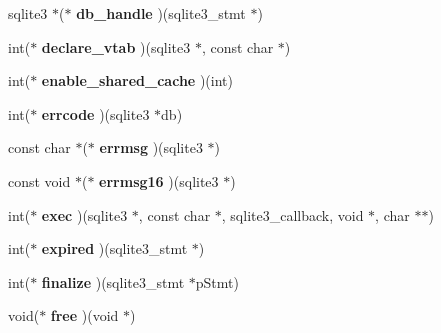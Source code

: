 \begin{DoxyCompactItemize}
sqlite3 $\ast$($\ast$ {\bfseries db\+\_\+handle} )(sqlite3\+\_\+stmt $\ast$)
\item 
\mbox{\label{structsqlite3__api__routines_abe47369f89df1193ca28751e8d024818}} 
int($\ast$ {\bfseries declare\+\_\+vtab} )(sqlite3 $\ast$, const char $\ast$)
\item 
\mbox{\label{structsqlite3__api__routines_ae67da9e0a3629fd1fd46fd73389d8c98}} 
int($\ast$ {\bfseries enable\+\_\+shared\+\_\+cache} )(int)
\item 
\mbox{\label{structsqlite3__api__routines_a1a985d959eafe6f293e41a5ca1d1a2e9}} 
int($\ast$ {\bfseries errcode} )(sqlite3 $\ast$db)
\item 
\mbox{\label{structsqlite3__api__routines_a69002673143895d276850a400e7955d7}} 
const char $\ast$($\ast$ {\bfseries errmsg} )(sqlite3 $\ast$)
\item 
\mbox{\label{structsqlite3__api__routines_a1392e153c69f5b32fd8acc19cb780baf}} 
const void $\ast$($\ast$ {\bfseries errmsg16} )(sqlite3 $\ast$)
\item 
\mbox{\label{structsqlite3__api__routines_ac6476ec4fd66eb629942bd60a47adf76}} 
int($\ast$ {\bfseries exec} )(sqlite3 $\ast$, const char $\ast$, sqlite3\+\_\+callback, void $\ast$, char $\ast$$\ast$)
\item 
\mbox{\label{structsqlite3__api__routines_aaf5ef34c7b325eefb8459224a5c926e8}} 
int($\ast$ {\bfseries expired} )(sqlite3\+\_\+stmt $\ast$)
\item 
\mbox{\label{structsqlite3__api__routines_a0bbe0b1cdd61a2e7e089ad1e42978f6f}} 
int($\ast$ {\bfseries finalize} )(sqlite3\+\_\+stmt $\ast$p\+Stmt)
\item 
\mbox{\label{structsqlite3__api__routines_a7418560cd2dacb9a6cb0b7f5e3082787}} 
void($\ast$ {\bfseries free} )(void $\ast$)
\item 
\mbox{\label{structsqlite3__api__routines_aa94faa431905ee9d04bb93cbce735a0c}} 
$$
\end{DoxyCompactItemize}
